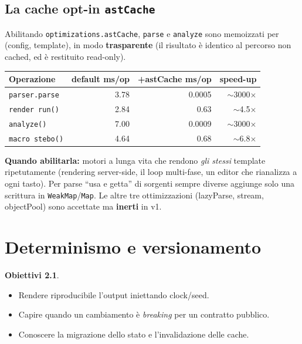 \documentclass[11pt,a4paper]{book}
\let\code\lstinline
\newcommand{\ic}[1]{{\ttfamily #1}}
\theoremstyle{definition}
\newtheorem*{obiettivi}{Obiettivi}
\begin{document}
{{{{\section{La cache opt-in \texttt{astCache}}

Abilitando \code|optimizations.astCache|, \code|parse| e \code|analyze| sono
memoizzati per \ic{(config, template)}, in modo \textbf{trasparente} (il risultato è
identico al percorso non cached, ed è restituito read-only).

\begin{center}
\small
\begin{tabular}{@{}l r r r@{}}
\toprule
\textbf{Operazione} & \textbf{default ms/op} & \textbf{+astCache ms/op} & \textbf{speed-up} \\
\midrule
\code|parser.parse| & 3.78 & 0.0005 & $\sim$3000$\times$ \\
\code|render run()| & 2.84 & 0.63 & $\sim$4.5$\times$ \\
\code|analyze()| & 7.00 & 0.0009 & $\sim$3000$\times$ \\
\code|macro stebo()| & 4.64 & 0.68 & $\sim$6.8$\times$ \\
\bottomrule
\end{tabular}
\end{center}

\textbf{Quando abilitarla:} motori a lunga vita che rendono \emph{gli stessi}
template ripetutamente (rendering server-side, il loop multi-fase, un editor che
rianalizza a ogni tasto). Per parse ``usa e getta'' di sorgenti sempre diverse
aggiunge solo una scrittura in \code|WeakMap|/\code|Map|. Le altre tre ottimizzazioni
(\ic{lazyParse}, \ic{stream}, \ic{objectPool}) sono accettate ma \textbf{inerti} in
v1.

\chapter{Determinismo e versionamento}
\label{ch:versionamento}

\begin{obiettivi}
\begin{itemize}
  \item Rendere riproducibile l'output iniettando \ic{clock}/\ic{seed}.
  \item Capire quando un cambiamento è \emph{breaking} per un contratto pubblico.
  \item Conoscere la migrazione dello stato e l'invalidazione delle cache.
\end{itemize}
\end{obiettivi}

}}}}
\end{document}
